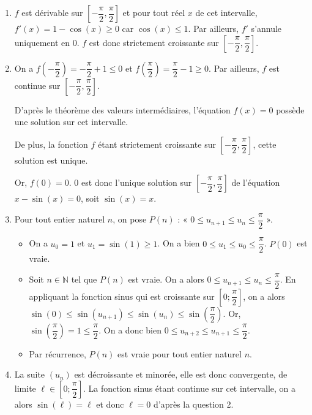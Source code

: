 \documentclass[11pt,fleqn, openany]{book} %
\begin{document}
\begin{solution}\hspace{0pt}
\begin{enumerate}
\item $f$ est dérivable sur $\left[-\dfrac{\pi}{2},\dfrac{\pi}{2}\right]$ et pour tout réel $x$ de cet intervalle, $f'(x)=1-\cos(x) \geqslant 0$ car $\cos(x) \leqslant 1$. Par ailleurs, $f'$ s'annule uniquement en $0$. $f$ est donc strictement croissante sur $\left[-\dfrac{\pi}{2},\dfrac{\pi}{2}\right]$.
\vskip5pt
\item On a $f\left(-\dfrac{\pi}{2}\right)=-\dfrac{\pi}{2}+1 \leqslant 0$ et $f\left(\dfrac{\pi}{2}\right)=\dfrac{\pi}{2}-1 \geqslant 0$. Par ailleurs, $f$ est continue sur  $\left[-\dfrac{\pi}{2},\dfrac{\pi}{2}\right]$. 

D'après le théorème des valeurs intermédiaires, l'équation $f(x)=0$ possède une solution sur cet intervalle. 

De plus, la fonction $f$ étant strictement croissante sur  $\left[-\dfrac{\pi}{2},\dfrac{\pi}{2}\right]$, cette solution est unique. 

Or, $f(0)=0$. $0$ est donc l'unique solution sur  $\left[-\dfrac{\pi}{2},\dfrac{\pi}{2}\right]$ de l'équation $x-\sin(x)=0$, soit $\sin(x)=x$. 
\vskip5pt
\item Pour tout entier naturel $n$, on pose $P(n)$ : « $0 \leqslant u_{n+1} \leqslant u_n \leqslant \dfrac{\pi}{2}$ ».
\begin{itemize}
\item On a $u_0=1$ et $u_1=\sin(1)\geqslant 1$. On a bien $0 \leqslant u_{1} \leqslant u_0 \leqslant \dfrac{\pi}{2}$. $P(0)$ est vraie.
\item Soit $n\in\mathbb{N}$ tel que $P(n)$ est vraie. On a alors $0 \leqslant u_{n+1} \leqslant u_n \leqslant \dfrac{\pi}{2}$. En appliquant la fonction sinus qui est croissante sur $\left[0;\dfrac{\pi}{2}\right]$, on a alors $\sin(0) \leqslant \sin(u_{n+1}) \leqslant \sin(u_n) \leqslant \sin\left(\dfrac{\pi}{2}\right)$. Or, $\sin\left(\dfrac{\pi}{2}\right)=1 \leqslant \dfrac{\pi}{2}$. On a donc bien $0 \leqslant u_{n+2} \leqslant u_{n+1} \leqslant \dfrac{\pi}{2}$.
\item Par récurrence, $P(n)$ est vraie pour tout entier naturel $n$.
\end{itemize}
\vskip5pt
\item La suite $(u_n)$ est décroissante et minorée, elle est donc convergente, de limite $\ell \in \left[0;\dfrac{\pi}{2}\right]$. La fonction sinus étant continue sur cet intervalle, on a alors $\sin(\ell)=\ell$ et donc $\ell=0$ d'après la question 2.
\end{enumerate}\end{solution}
\end{document}
